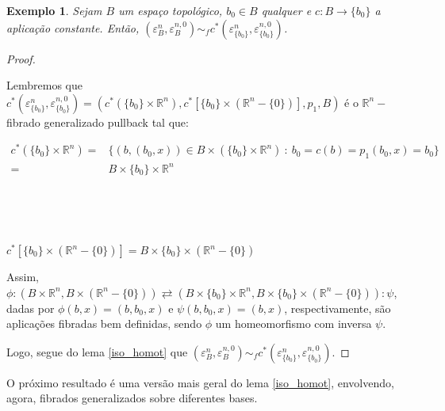 \documentclass[12pt,oneside]{book} %
\newtheorem{ex}     {\hspace{0.5cm}Exemplo}[chapter]
\newcommand{\R}{\mathbb{R}}
\begin{document}
\begin{ex}\label{fht_pullback_ex2}
	Sejam $B$ um espaço topológico, $b_{0}\in B$ qualquer e $c:B\to \{ b_{0} \}$ a aplicação constante. Então, $(\varepsilon^{n}_{B},\varepsilon^{n,0}_{B})\sim_{f} c^{*}(\varepsilon^{n}_{\{ b_{0} \}},\varepsilon^{n,0}_{\{ b_{0} \}})$.
\end{ex}
\begin{proof}
	
	\
	
	\par Lembremos que $c^{*}(\varepsilon^{n}_{\{ b_{0} \}},\varepsilon^{n,0}_{\{ b_{0} \}})=(c^{*}(\{ b_{0} \}\times\R^{n}),c^{*}[\{ b_{0} \}\times (\R^{n}-\{ 0 \})],p_{1},B)$ é o $\R^{n}-$fibrado generalizado pullback tal que: \newline
	
	$\begin{array}{rl}
		c^{*}(\{ b_{0} \}\times\R^{n})= & \{ (b,(b_{0},x))\in B\times(\{ b_{0} \}\times\R^{n}) \ : \ b_{0}=c(b)=p_{1}(b_{0},x)=b_{0} \} \\
		= & B\times \{ b_{0} \}\times\R^{n}
	\end{array}$
	
	\
	
	\
	
	$c^{*}[\{ b_{0} \}\times (\R^{n}-\{ 0 \})]=B\times\{ b_{0} \}\times(\R^{n}-\{ 0 \})$ \newline
	
	\par Assim, $\phi:(B\times\R^{n},B\times(\R^{n}-\{ 0 \}))\rightleftarrows (B\times\{ b_{0} \}\times\R^{n},B\times\{ b_{0} \}\times(\R^{n}-\{ 0 \})):\psi$, dadas por $\phi(b,x)=(b,b_{0},x)$ e $\psi(b,b_{0},x)=(b,x)$, respectivamente, são aplicações fibradas bem definidas, sendo $\phi$ um homeomorfismo com inversa $\psi$.
	
	\par Logo, segue do lema \ref{iso_homot} que $(\varepsilon^{n}_{B},\varepsilon^{n,0}_{B})\sim_{f} c^{*}(\varepsilon^{n}_{\{ b_{0} \}},\varepsilon^{n,0}_{\{ b_{0} \}})$.
	
\end{proof}

\par O próximo resultado é uma versão mais geral do lema \ref{iso_homot}, envolvendo, agora, fibrados generalizados sobre diferentes bases.
\end{document}
